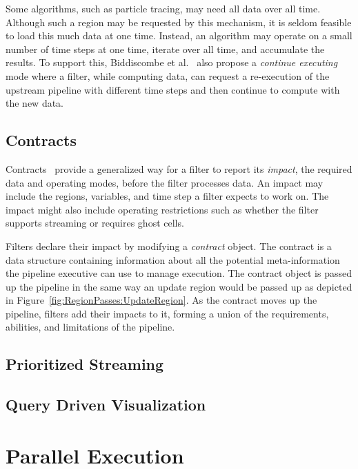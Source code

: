 \documentclass{article}
\newcommand*{\lcite}[1]{~\cite{#1}}
\newcommand*{\scite}[1]{~\cite{#1}}
\newcommand*{\keyterm}[1]{\emph{#1}}
\newcommand{\etal}{et al.}
\begin{document}
Some algorithms, such as particle tracing, may need all data over all time.
Although such a region may be requested by this mechanism, it is seldom
feasible to load this much data at one time.  Instead, an algorithm may
operate on a small number of time steps at one time, iterate over all time,
and accumulate the results.  To support this, Biddiscombe
\etal\scite{Biddiscombe2007} also propose a \keyterm{continue executing}
mode where a filter, while computing data, can request a re-execution of
the upstream pipeline with different time steps and then continue to
compute with the new data.

\subsection{Contracts}
\label{sec:Contracts}

Contracts\lcite{Childs2005} provide a generalized way for a filter to report
its \keyterm{impact}, the required data and operating modes, before the
filter processes data.  An impact may include the regions, variables, and
time step a filter expects to work on.  The impact might also include
operating restrictions such as whether the filter supports streaming or
requires ghost cells.

Filters declare their impact by modifying a \keyterm{contract} object.  The
contract is a data structure containing information about all the potential
meta-information the pipeline executive can use to manage execution.  The
contract object is passed up the pipeline in the same way an update region
would be passed up as depicted in
Figure~\ref{fig:RegionPasses:UpdateRegion}.  As the contract moves up the
pipeline, filters add their impacts to it, forming a union of the
requirements, abilities, and limitations of the pipeline.

\subsection{Prioritized Streaming}
\label{sec:PrioritizedStreaming}

\subsection{Query Driven Visualization}
\label{sec:QueryDrivenVisualization}


\section{Parallel Execution}
\label{sec:ParallelExecution}
\end{document}
